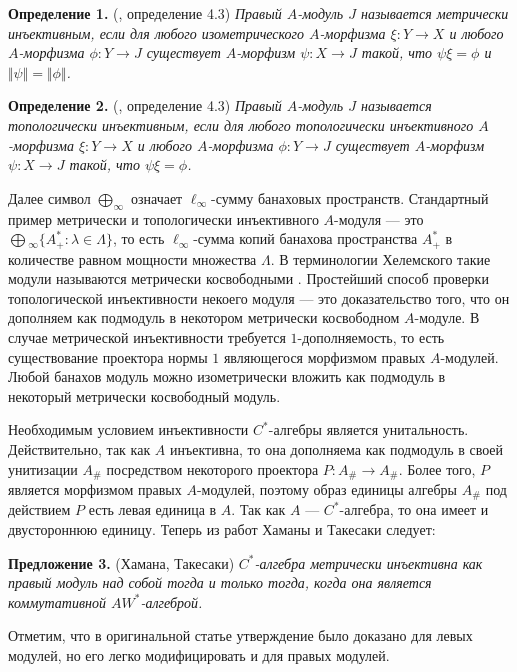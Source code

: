 \documentclass[12pt]{article}
\begin{document}
\medskip
\textbf{Определение 1.} (\cite{HelMetrFrQMod}, определение 4.3) \textit{Правый $A$-модуль $J$ называется метрически инъективным, если для любого изометрического $A$-морфизма $\xi:Y\to X$ и любого $A$-морфизма $\phi:Y\to J$ существует $A$-морфизм $\psi:X\to J$ такой, что $\psi\xi=\phi$  и $\Vert\psi\Vert=\Vert\phi\Vert$.}

\medskip
\textbf{Определение 2.} (\cite{HelMetrFrQMod}, определение 4.3) \textit{Правый $A$-модуль $J$ называется топологически инъективным, если для любого топологически инъективного $A$-морфизма $\xi:Y\to X$ и любого $A$-морфизма $\phi:Y\to J$ существует $A$-морфизм $\psi:X\to J$ такой, что $\psi\xi=\phi$.}

\medskip
Далее символ $\bigoplus_\infty$ означает $\ell_\infty$-сумму банаховых пространств. Стандартный пример метрически и топологически инъективного $A$-модуля --- это $\bigoplus{}_\infty\{A_+^*:\lambda\in\Lambda\}$, то есть $\ell_\infty$-сумма копий банахова пространства $A_+^*$ в количестве равном мощности множества $\Lambda$. В терминологии Хелемского такие модули называются метрически косвободными \cite{HelMetrFrQMod}. Простейший способ проверки топологической инъективности некоего модуля --- это доказательство того, что он дополняем как подмодуль в некотором метрически косвободном $A$-модуле. В случае метрической инъективности требуется $1$-дополняемость, то есть существование проектора нормы $1$ являющегося морфизмом правых $A$-модулей. Любой банахов модуль можно изометрически вложить как подмодуль в некоторый метрически косвободный модуль.

Необходимым условием инъективности $C^*$-алгебры является унитальность. Действительно, так как $A$ инъективна, то она дополняема как подмодуль в своей унитизации $A_\#$ посредством некоторого проектора $P:A_\#\to A_\#$. Более того, $P$ является морфизмом правых $A$-модулей, поэтому образ единицы алгебры $A_\#$ под действием $P$ есть левая единица в $A$. Так как $A$ --- $C^*$-алгебра, то она имеет и двустороннюю единицу. Теперь из работ Хаманы \cite{HamInjEnvBanMod} и Такесаки \cite{TakHanBanThAndJordDecomOfModMap} следует:

\medskip
\textbf{Предложение 3.} (Хамана, Такесаки) \textit{$C^*$-алгебра метрически инъективна как правый модуль над собой тогда и только тогда, когда она является коммутативной $AW^*$-алгеброй.}

\medskip
Отметим, что в оригинальной статье утверждение было доказано для левых модулей, но его легко модифицировать и для правых модулей.
\end{document}

